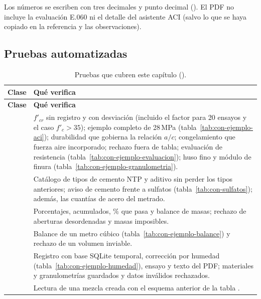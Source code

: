 Los números se escriben con tres decimales y punto decimal (). El PDF no incluye la evaluación E.060
ni el detalle del asistente ACI (salvo lo que se haya copiado en la referencia y las observaciones).

\subsection{Pruebas automatizadas}
\label{sec:con-pruebas}

\begin{longtable}{L{4.6cm}L{9cm}}
	\caption{Pruebas que cubren este capítulo ().} \label{tab:con-pruebas} \\
	\hline
	\textbf{Clase} & \textbf{Qué verifica} \\ \hline
	\endfirsthead
	\hline
	\textbf{Clase} & \textbf{Qué verifica} \\ \hline
	\endhead
	\hline
	\endfoot
	 & $f'_{cr}$ sin registro y con desviación (incluido el factor para 20 ensayos y el caso
	$f'_c > 35$); ejemplo completo de 28\,MPa (tabla~\ref{tab:con-ejemplo-aci}); durabilidad que gobierna la relación
	$a/c$; congelamiento que fuerza aire incorporado; rechazo fuera de tabla; evaluación de resistencia
	(tabla~\ref{tab:con-ejemplo-evaluacion}); huso fino y módulo de finura (tabla~\ref{tab:con-ejemplo-granulometria}). \\
	 & Catálogo de tipos de cemento NTP y aditivo sin perder los tipos anteriores; aviso de
	cemento frente a sulfatos (tabla~\ref{tab:con-sulfatos}); además, las cuantías de acero del metrado. \\
	 & Porcentajes, acumulados, \% que pasa y balance de masas; rechazo de aberturas desordenadas
	y masas imposibles. \\
	 & Balance de un metro cúbico (tabla~\ref{tab:con-ejemplo-balance}) y rechazo de un
	volumen inviable. \\
	 & Registro con base SQLite temporal, corrección por humedad
	(tabla~\ref{tab:con-ejemplo-humedad}), ensayo y texto del PDF; materiales y granulometrías guardados y datos
	inválidos rechazados. \\
	 & Lectura de una mezcla creada con el esquema anterior de la tabla . \\
\end{longtable}

